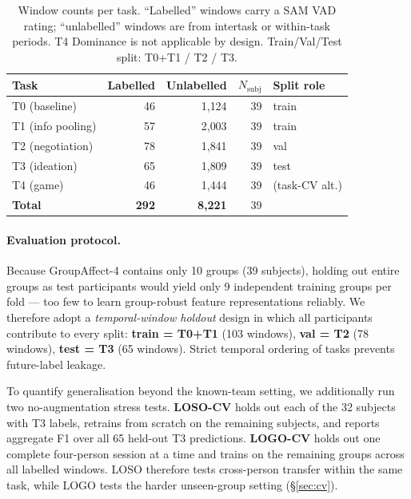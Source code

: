 \documentclass[sigconf,nonacm]{acmart}
\begin{document}
\begin{table}[t]
\caption{Window counts per task. ``Labelled'' windows carry a SAM VAD rating;
  ``unlabelled'' windows are from intertask or within-task periods.
  T4 Dominance is not applicable by design.
  Train/Val/Test split: T0+T1 / T2 / T3.}
\label{tab:window_counts}
\centering
\setlength{\tabcolsep}{4pt}
\small
\begin{tabular}{lrrrl}
\toprule
\textbf{Task} & \textbf{Labelled} & \textbf{Unlabelled} & \textbf{$N_{\text{subj}}$} & \textbf{Split role} \\
\midrule
T0 (baseline)     &  46 & 1{,}124 & 39 & train \\
T1 (info pooling) &  57 & 2{,}003 & 39 & train \\
T2 (negotiation)  &  78 & 1{,}841 & 39 & val \\
T3 (ideation)     &  65 & 1{,}809 & 39 & test \\
T4 (game)         &  46 & 1{,}444 & 39 & (task-CV alt.) \\
\midrule
\textbf{Total}    & \textbf{292} & \textbf{8{,}221} & 39 & \\
\bottomrule
\end{tabular}
\end{table}

\paragraph{Evaluation protocol.}
Because GroupAffect-4 contains only 10 groups (39 subjects), holding out
entire groups as test participants would yield only 9 independent training
groups per fold --- too few to learn group-robust feature representations
reliably.
We therefore adopt a \emph{temporal-window holdout} design in which all
participants contribute to every split:
\textbf{train = T0+T1} (103 windows),
\textbf{val = T2} (78 windows),
\textbf{test = T3} (65 windows).
Strict temporal ordering of tasks prevents future-label leakage.

To quantify generalisation beyond the known-team setting, we additionally run
two no-augmentation stress tests.
\textbf{LOSO-CV} holds out each of the 32 subjects with T3 labels, retrains
from scratch on the remaining subjects, and reports aggregate F1 over all
65 held-out T3 predictions.
\textbf{LOGO-CV} holds out one complete four-person session at a time and
trains on the remaining groups across all labelled windows.
LOSO therefore tests cross-person transfer within the same task, while LOGO
tests the harder unseen-group setting (\S\ref{sec:cv}).
\end{document}
